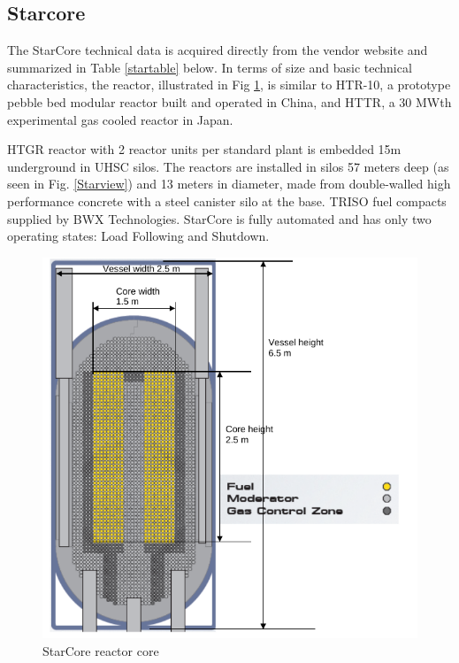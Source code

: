 \subsection{Starcore}
The StarCore technical data is acquired directly from the vendor website and summarized in Table \ref{startable} below. In terms of size and basic technical characteristics, the reactor, illustrated in Fig \ref{Starcore}, is similar to HTR-10, a prototype pebble bed modular reactor built and operated in China, and HTTR, a 30 MWth experimental gas cooled reactor in Japan.

HTGR reactor with 2 reactor units per standard plant is embedded 15m underground in \gls{UHSC} silos. The reactors are installed in silos 57 meters deep (as seen in Fig. \ref{Starview}) and 13 meters in diameter, made from double-walled high performance concrete with a steel canister silo at the base.  TRISO fuel compacts supplied by BWX Technologies. StarCore is fully automated and has only two operating states: Load Following and Shutdown.

\begin{figure}[htbp]
\centering
\includegraphics[scale=0.5]{Figs/starcorereactor.jpeg}
\caption{StarCore reactor core}
\label{Starcore}
\end{figure}

